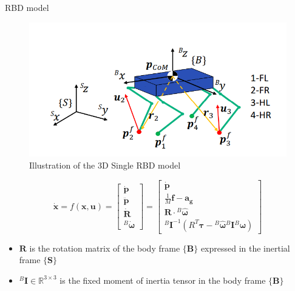 \documentclass{beamer}
\begin{document}
\begin{frame}{RBD model}


\begin{figure}
    \centering
    \includegraphics[width=0.5\linewidth]{Presentation-4/images/Illustration-RBD-model.png}
    \caption{Illustration of the 3D Single RBD model}
    \label{fig:rbd-model}
\end{figure}

\begin{equation*}
    \mathbf{\dot{x}} = f(\mathbf{x}, \mathbf{u}) = 
    \begin{bmatrix}
    \mathbf{\dot{p}} \\
    \mathbf{\ddot{p}} \\
    \mathbf{\dot{R}} \\
    {}^{B}\boldsymbol{\dot{\omega}}
    \end{bmatrix}
    =
    \begin{bmatrix}
    \mathbf{\dot{p}} \\
    \frac{1}{M} \mathbf{f} - \mathbf{a_g} \\
    \mathbf{R} \cdot {}^{B}\hat{\boldsymbol{\omega}} \\
    {}^{B} \mathbf{I}^{-1}(R^T \boldsymbol{\tau} - {}^{B}\hat{\boldsymbol{\omega}} {}^{B} \mathbf{I} {}^{B}\boldsymbol{\omega})
    \end{bmatrix}
\end{equation*}

\begin{itemize}
    \scriptsize
    \item $\mathbf{R}$ is the rotation matrix of the body frame $\{ \mathbf{B} \}$ expressed in the inertial frame $\{ \mathbf{S} \}$
    \item ${}^{B} \mathbf{I} \in \mathbb{R}^{3\times 3}$ is the fixed moment of inertia tensor in the body frame $\{ \mathbf{B} \}$
\end{itemize}
\end{frame}
\end{document}

